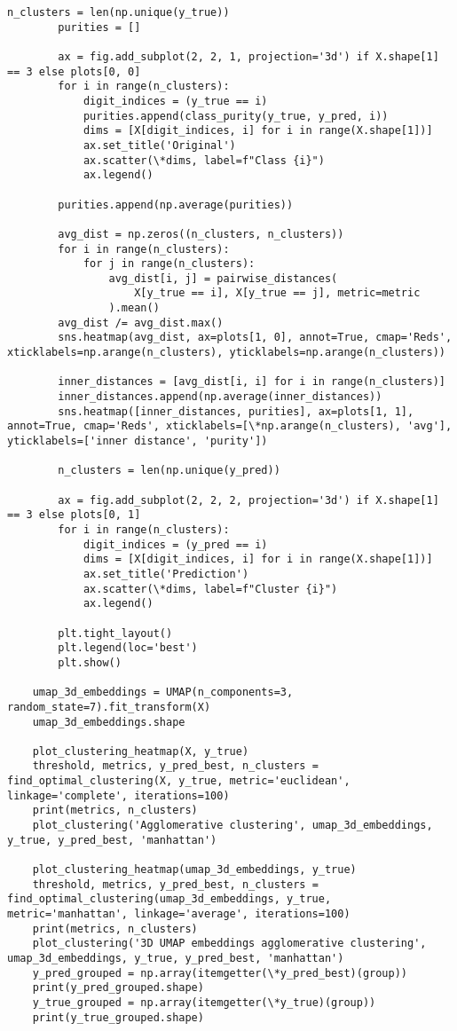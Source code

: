 \begin{lstlisting}[label=lst:1,caption=Кластеризация респондентов социологического исследования]
		n_clusters = len(np.unique(y_true))
		purities = []
		
		ax = fig.add_subplot(2, 2, 1, projection='3d') if X.shape[1] == 3 else plots[0, 0]
		for i in range(n_clusters):
			digit_indices = (y_true == i)
			purities.append(class_purity(y_true, y_pred, i))
			dims = [X[digit_indices, i] for i in range(X.shape[1])]
			ax.set_title('Original')
			ax.scatter(\*dims, label=f"Class {i}")
			ax.legend()
		
		purities.append(np.average(purities))
		
		avg_dist = np.zeros((n_clusters, n_clusters))
		for i in range(n_clusters):
			for j in range(n_clusters):
				avg_dist[i, j] = pairwise_distances(
					X[y_true == i], X[y_true == j], metric=metric
				).mean()
		avg_dist /= avg_dist.max()
		sns.heatmap(avg_dist, ax=plots[1, 0], annot=True, cmap='Reds', xticklabels=np.arange(n_clusters), yticklabels=np.arange(n_clusters))
		
		inner_distances = [avg_dist[i, i] for i in range(n_clusters)]
		inner_distances.append(np.average(inner_distances))
		sns.heatmap([inner_distances, purities], ax=plots[1, 1], annot=True, cmap='Reds', xticklabels=[\*np.arange(n_clusters), 'avg'], yticklabels=['inner distance', 'purity'])
		
		n_clusters = len(np.unique(y_pred))
		
		ax = fig.add_subplot(2, 2, 2, projection='3d') if X.shape[1] == 3 else plots[0, 1]
		for i in range(n_clusters):
			digit_indices = (y_pred == i)
			dims = [X[digit_indices, i] for i in range(X.shape[1])]
			ax.set_title('Prediction')
			ax.scatter(\*dims, label=f"Cluster {i}")
			ax.legend()
		
		plt.tight_layout()
		plt.legend(loc='best')
		plt.show()
	
	umap_3d_embeddings = UMAP(n_components=3, random_state=7).fit_transform(X)
	umap_3d_embeddings.shape
	
	plot_clustering_heatmap(X, y_true)
	threshold, metrics, y_pred_best, n_clusters = find_optimal_clustering(X, y_true, metric='euclidean', linkage='complete', iterations=100)
	print(metrics, n_clusters)
	plot_clustering('Agglomerative clustering', umap_3d_embeddings, y_true, y_pred_best, 'manhattan')
	
	plot_clustering_heatmap(umap_3d_embeddings, y_true)
	threshold, metrics, y_pred_best, n_clusters = find_optimal_clustering(umap_3d_embeddings, y_true, metric='manhattan', linkage='average', iterations=100)
	print(metrics, n_clusters)
	plot_clustering('3D UMAP embeddings agglomerative clustering', umap_3d_embeddings, y_true, y_pred_best, 'manhattan')
	y_pred_grouped = np.array(itemgetter(\*y_pred_best)(group))
	print(y_pred_grouped.shape)
	y_true_grouped = np.array(itemgetter(\*y_true)(group))
	print(y_true_grouped.shape)
	

\end{lstlisting}
